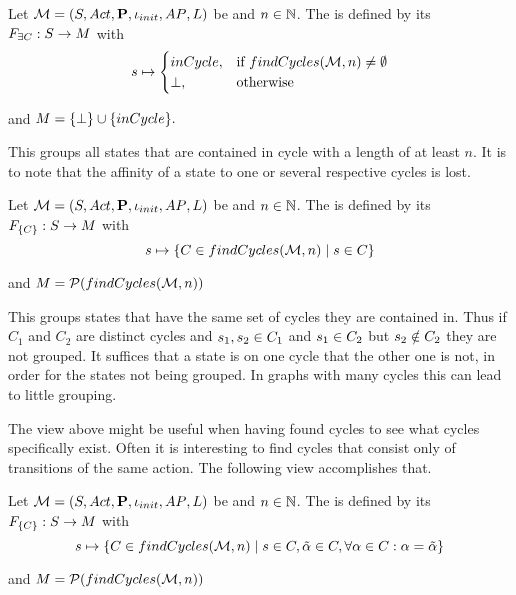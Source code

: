 \documentclass[preview]{standalone}
\begin{document}
\begin{definition}
	Let ${{{\mathcal{M}}}} = {{({S}, {Act}, {\textbf{P}}, {\iota_{init}}, {AP}, {L})}}$ be \chosengraphtypeN and $n \in {\mathbb{N}}$. The \viewN \viewhascycle is defined by its \grpfctN ${{F_{\exists{C}}}} : {S} \to {\ensuremath{{M}}}$ with
	\[
	{s} \mapsto
	\begin{cases}
		inCycle, &\text{if } {findCycles}({{{\mathcal{M}}}}, n) \neq \emptyset \\
		{\bot}, &\text{otherwise}
	\end{cases}
	\]
	
	and ${{M}} = {\{\bot\}} \cup \{inCycle\}.$
\end{definition}

This \viewN groups all states that are contained in cycle with a length of at least $n$. It is to note that the affinity of a state to one or several respective cycles is lost.


\begin{definition}
	Let ${{{\mathcal{M}}}} = {{({S}, {Act}, {\textbf{P}}, {\iota_{init}}, {AP}, {L})}}$ be \chosengraphtypeN and $n \in {\mathbb{N}}$. The \viewN \viewexactcycle is defined by its \grpfctN ${{F_{\{{C}\}}}} : {S} \to {\ensuremath{{M}}}$ with
	\[
	{s} \mapsto \{{C} \in {findCycles}({{{\mathcal{M}}}}, n) \mid {s} \in {C}\}
	\]
	
	and ${{M}} = {\mathcal{P}({findCycles}({{{\mathcal{M}}}}, n))}$
	\label{def:exactcycleview}
\end{definition}

This \viewN groups states that have the same set of cycles they are contained in. Thus if $C_1$ and $C_2$ are distinct cycles and ${s}_1, {s}_2 \in {C}_1$ and ${s}_1 \in {C}_2$ but ${s}_2 \notin {C}_2$ they are not grouped. It suffices that a state is on one cycle that the other one is not, in order for the states not being grouped. In graphs with many cycles this can lead to little grouping.



The view above might be useful when having found cycles to see what cycles specifically exist. Often it is interesting to find cycles that consist only of transitions of the same action. The following view accomplishes that.

\begin{definition}
	Let ${{{\mathcal{M}}}} = {{({S}, {Act}, {\textbf{P}}, {\iota_{init}}, {AP}, {L})}}$ be \chosengraphtypeN and $n \in {\mathbb{N}}$. The \viewN \viewexactcycle is defined by its \grpfctN ${{F_{\{{C}\}}}} : {S} \to {\ensuremath{{M}}}$ with
	\[
	{s} \mapsto \{{C} \in {findCycles}({{{\mathcal{M}}}}, n) \mid {s} \in {C}, \tilde{{\alpha}} \in {C}, \forall {\alpha} \in {C} : {\alpha} = \tilde{{\alpha}} \}
	\]
	
	and ${{M}} = {\mathcal{P}({findCycles}({{{\mathcal{M}}}}, n))}$
\end{definition}
\end{document}
